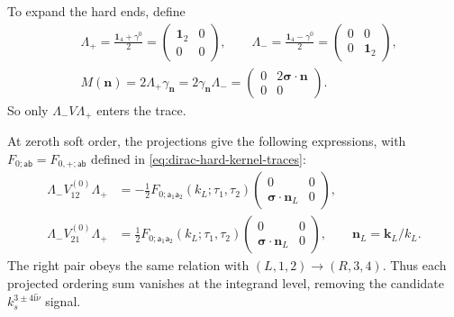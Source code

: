 \documentclass[a4paper,12pt]{article}
\newcommand{\ii}{\mathrm i}
\newcommand{\mb}{\mathbf}
\newcommand{\tn}{\tilde\nu}
\def\aa{\mathsf a}
\newcommand{\bb}{\mathsf b}
\begin{document}
To expand the hard ends, define
\begin{equation}
 \begin{aligned}
 &\Lambda_+=\frac{\mathbf1_4+\gamma^0}{2}
 =\begin{pmatrix}\mathbf1_2&0\\0&0\end{pmatrix},\qquad
 \Lambda_-=\frac{\mathbf1_4-\gamma^0}{2}
 =\begin{pmatrix}0&0\\0&\mathbf1_2\end{pmatrix},\\[2mm]
 &M(\mb n)=2\Lambda_+\gamma_{\mb n}
          =2\gamma_{\mb n}\Lambda_-
          =\begin{pmatrix}0&2\bm\sigma\cdot\mb n\\0&0\end{pmatrix}.
 \end{aligned}
 \label{eq:dirac-soft-projectors}
\end{equation}
So only $\Lambda_-V\Lambda_+$ enters the trace. 

At zeroth soft order,
the projections give the following
expressions, with $F_{0;\aa\bb}=F_{0,+;\aa\bb}$ defined in
\eqref{eq:dirac-hard-kernel-traces}:
\begin{align}
 \Lambda_-V_{12}^{(0)}\Lambda_+
 &=-\frac12F_{0;\aa_1\aa_2}(k_L;\tau_1,\tau_2)
       \begin{pmatrix}0&0\\\bm\sigma\cdot\mb n_L&0\end{pmatrix},
 \nonumber\\
 \Lambda_-V_{21}^{(0)}\Lambda_+
 &=\frac12F_{0;\aa_1\aa_2}(k_L;\tau_1,\tau_2)
       \begin{pmatrix}0&0\\\bm\sigma\cdot\mb n_L&0\end{pmatrix},
 \qquad \mb n_L=\mb k_L/k_L.
 \label{eq:dirac-cancellation}
\end{align}
The right pair obeys the same relation with $(L,1,2)\to(R,3,4)$.
Thus each projected ordering sum vanishes at the
integrand level, removing the candidate $k_s^{3\pm4\ii\tn}$ signal.
\end{document}
